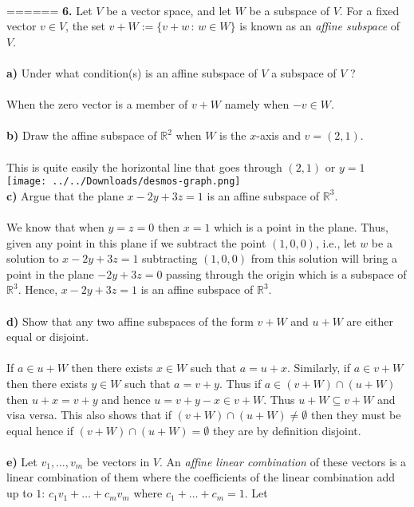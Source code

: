 \documentclass[11pt]{amsart}
\theoremstyle{definition}  %
\newcommand{\R}{\mathbb{R}}
\begin{document}
\\
======
\newpage
\vskip 0.1cm
\noindent
{\bf 6.} Let $V$ be a vector space, and let $W$ be a subspace of $V$. For a fixed vector $v \in V$, the set $v + W := \{v + w \, : \, w \in W\}$
is known as an {\it affine subspace} of $V$. \\
\\
{\bf a)} Under what condition(s) is an affine subspace of $V$ a subspace of $V$ ? \\
\\
When the zero vector is a member of $v+W$ namely when $-v \in W$.
\\
\\
{\bf b)} Draw the affine subspace of $\R^2$ when $W$ is the $x$-axis and $v = (2,1)$. \\
\\
This is quite easily the horizontal line that goes through $(2,1)$ or $y=1$\\\texttt{[image: ../../Downloads/desmos-graph.png]} 
\\
{\bf c)} Argue that  the plane $x - 2y + 3z = 1$ is an affine subspace of $\R^3$. \\
\\
We know that when $y=z=0$ then $x=1$ which is a point in the plane.  Thus, given any point in this plane if we subtract the point $(1,0,0)$, i.e., let $w$ be a solution to $x-2y+3z=1$ subtracting $(1,0,0)$ from this solution will bring a point in the plane $-2y+3z=0$ passing through the origin which is a subspace of $\R^3$.  Hence, $x-2y+3z=1$ is an affine subspace of $\R^3$. \\
\\
{\bf d)} Show that any two affine subspaces of the form $v + W$ and $u + W$ are either equal or disjoint. \\
\\
If $a \in u+W$ then there exists $x\in W$ such that $a=u+x$. Similarly, if $a \in v+W$ then there exists $y \in W$ such that $a=v+y$.  Thus if $a \in (v+W) \cap (u+W)$ then $u+x=v+y$ and hence $u= v+y-x \in v +W$.  Thus $u+W \subseteq v+W$ and visa versa. This also shows that if $(v+W)\cap(u+W) \ne \emptyset$ then they must be equal hence if $(v+W)\cap(u+W) = \emptyset$ they are by definition disjoint.\\
\\
{\bf e)} Let $v_1, \ldots, v_m$ be vectors in $V$. An {\it affine linear combination} of these vectors is a linear combination of them where
the coefficients of the linear combination add up to $1$: $c_1 v_1 + \ldots + c_m v_m$ where $c_1 + \ldots + c_m =1$. Let 
\end{document}
